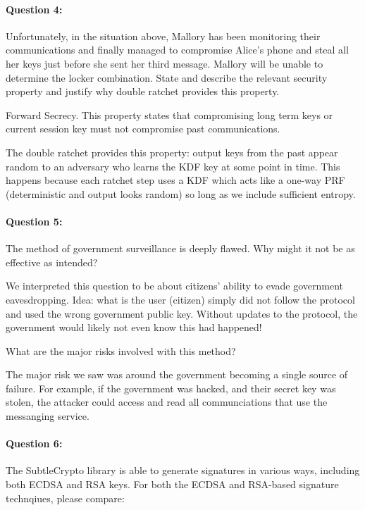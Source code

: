 \documentclass[12pt,letterpaper,twoside]{article}
\begin{document}
\paragraph{Question 4: } Unfortunately, in the situation above, Mallory 
has been monitoring their communications and finally managed to compromise 
Alice's phone and steal all her keys just before she sent her third message.
Mallory will be unable to determine the locker combination. State and describe 
the relevant security property and justify why double ratchet provides this
property.

{\color{purple} Forward Secrecy. This property states that compromising long
term keys or current session key must not compromise past communications.

The double ratchet provides this property: output keys from the past appear 
random to an adversary who learns the KDF key at some point in time. This 
happens because each ratchet step uses a KDF which acts like a one-way 
PRF (deterministic and output looks random) so long as we include 
sufficient entropy. }


\paragraph{Question 5: } The method of government surveillance is deeply
flawed. Why might it not be as effective as intended? 

{\color{purple} We interpreted this question to be about citizens' ability to 
evade government eavesdropping. Idea: what is the user (citizen) simply did not 
follow the protocol and used the wrong government public key. Without updates
to the protocol, the government would likely not even know this had happened!}

What are the major risks involved with this method?

{\color{purple} The major risk we saw was around the government becoming a single 
source of failure. For example, if the government was hacked, and their secret key was
stolen, the attacker could access and read all communciations that use the messanging
service. }


\paragraph{Question 6: } The SubtleCrypto library is able to generate signatures
in various ways, including both ECDSA and RSA keys. For both the ECDSA and RSA-based
signature technqiues, please compare:
\end{document}
